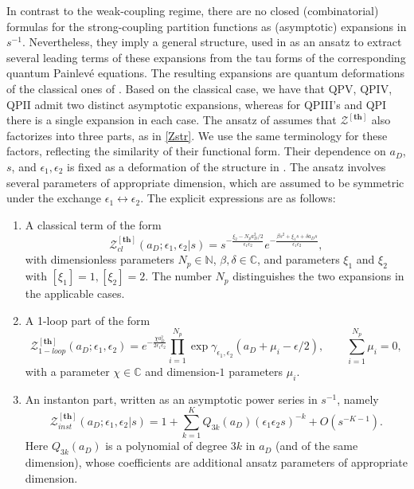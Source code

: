 \documentclass[12pt,a4paper]{article}
\numberwithin{equation}{section}
\newcommand{\D}{\scriptscriptstyle{D}}
\begin{document}
In contrast to the weak-coupling regime, there are no closed (combinatorial) formulas for the strong-coupling partition functions as (asymptotic) expansions in $s^{-1}$. Nevertheless, they imply a general structure, used in \cite{BST25} as an ansatz to extract several leading terms of these expansions from the tau forms of the corresponding quantum Painlev\'e equations.  The resulting expansions are quantum deformations of the classical ones of \cite{BLMST16}. Based on the classical case, we have that QPV, QPIV, QPII admit two distinct asymptotic expansions, whereas for QPIII's and QPI there is a single expansion in each case. The ansatz of \cite{BST25} assumes that $\mathcal{Z}^{[\mathbf{th}]}$ also factorizes into three parts, as in \eqref{Zstr}. We use the same terminology for these factors, reflecting the similarity of their functional form. Their dependence on $a_{\D}$, $s$, and $\epsilon_1,\epsilon_2$ is fixed as a deformation of the structure in \cite{BLMST16}. The ansatz involves several parameters of appropriate dimension, which are assumed to be symmetric under the exchange $\epsilon_1\leftrightarrow\epsilon_2$. The explicit expressions are as follows:
 \begin{enumerate}
    \item A classical term of the form
    \begin{equation}\label{Zcl_anz}
    \mathcal{Z}_{cl}^{[\mathbf{th}]}(a_{\D};\epsilon_1,\epsilon_2|s)=s^{-\frac{\xi_2-N_p a_{\D}^2/2}{\epsilon_1\epsilon_2}} e^{-\frac{\beta s^2+\xi_1 s+\delta a_{\D} s}{\epsilon_1\epsilon_2}},
    \end{equation}   
    with dimensionless parameters $N_p\in\mathbb{N}$, $\beta,\delta\in\mathbb{C}$, and parameters $\xi_1$ and $\xi_2$ with $[\xi_1]=1, [\xi_2]=2$. The number $N_p$ distinguishes the two expansions in the applicable cases. 
 \item A 1-loop part of the form   \begin{equation}\label{Z1loop_anz}
     \mathcal{Z}_{1-loop}^{[\mathbf{th}]}(a_{\D};\epsilon_1,\epsilon_2)=e^{-\frac{\chi a_{\D}^2}{2\epsilon_1\epsilon_2}}\prod_{i=1}^{N_p} \exp\gamma_{\epsilon_1,\epsilon_2}(a_{\D}+\mu_i-\epsilon/2), \qquad \sum_{i=1}^{N_p}\mu_i=0,
     \end{equation}
     with a parameter $\chi\in\mathbb{C}$ and dimension-$1$ parameters $\mu_i$.
    \item An instanton part, written as an asymptotic power series in $s^{-1}$, namely 
    \begin{equation}\label{Zinst_anz}
\mathcal{Z}_{inst}^{[\mathbf{th}]}(a_{\D};\epsilon_1,\epsilon_2|s)=1+\sum_{k=1}^{K} Q_{3k}(a_{\D}) (\epsilon_1\epsilon_2s)^{-k}+O(s^{-K-1}).    
    \end{equation}
    Here $Q_{3k}(a_{\D})$ is a polynomial of degree $3k$ in $a_{\D}$ (and of the same dimension), whose coefficients are additional ansatz parameters of appropriate dimension.
\end{enumerate} 
\end{document}
